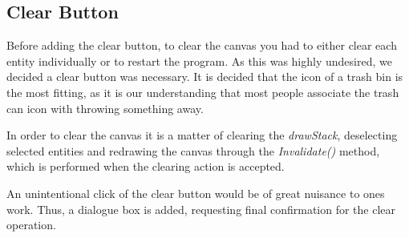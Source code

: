 \subsection{Clear Button}
Before adding the clear button, to clear the canvas you had to either clear each entity individually or to restart the program. 
As this was highly undesired, we decided a clear button was necessary.
It is decided that the icon of a trash bin is the most fitting, as it is our understanding that most people associate the trash can icon with throwing something away.

In order to clear the canvas it is a matter of clearing the \textit{drawStack}, deselecting selected entities and redrawing the canvas through the \textit{Invalidate()} method, which is performed when the clearing action is accepted.

An unintentional click of the clear button would be of great nuisance to ones work. 
Thus, a dialogue box is added, requesting final confirmation for the clear operation.


